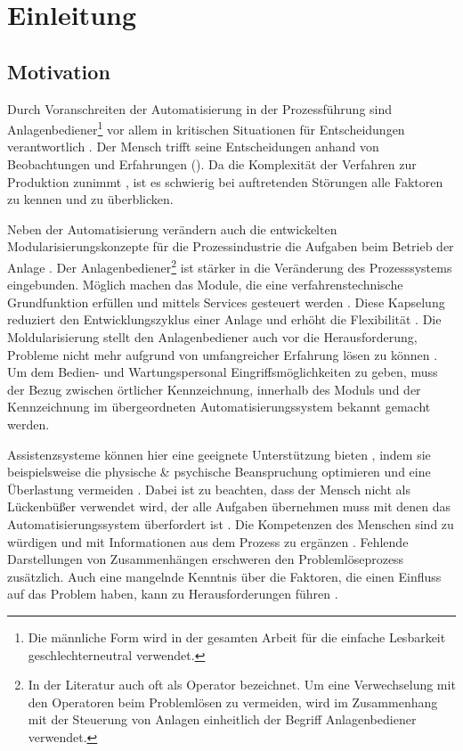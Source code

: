 
\chapter{Einleitung}
\label{sec:Einleitung}
\section{Motivation}
Durch Voranschreiten der Automatisierung in der Prozessführung sind Anlagenbediener\footnote{Die männliche Form wird in der gesamten Arbeit für die einfache Lesbarkeit geschlechterneutral verwendet.} vor allem in kritischen Situationen für Entscheidungen verantwortlich \cite{Bainbridge1983}. Der Mensch trifft seine Entscheidungen anhand von Beobachtungen und Erfahrungen (). Da die Komplexität der Verfahren zur Produktion zunimmt \cite{Poetter2007}, ist es schwierig bei auftretenden Störungen alle Faktoren zu kennen und zu überblicken. 

Neben der Automatisierung verändern auch die entwickelten Modularisierungskonzepte für die Prozessindustrie die Aufgaben beim Betrieb der Anlage \cite{Muller2017}. Der Anlagenbediener\footnote{In der Literatur auch oft als Operator bezeichnet. Um eine Verwechselung mit den Operatoren beim Problemlösen zu vermeiden, wird im Zusammenhang mit der Steuerung von Anlagen einheitlich der Begriff Anlagenbediener verwendet.} ist stärker in die Veränderung des Prozesssystems eingebunden. Möglich machen das Module, die eine verfahrenstechnische Grundfunktion erfüllen und mittels Services gesteuert werden \cite{Bloch2017}. Diese Kapselung reduziert den Entwicklungszyklus einer Anlage und erhöht die Flexibilität \cite{ZVEI2015}. Die Moldularisierung stellt den Anlagenbediener auch vor die Herausforderung, Probleme nicht mehr aufgrund von umfangreicher Erfahrung lösen zu können \cite{Muller2018}. \glqq Um dem Bedien- und Wartungspersonal Eingriffsmöglichkeiten zu geben, muss der Bezug zwischen örtlicher Kennzeichnung, innerhalb des Moduls und der Kennzeichnung im übergeordneten Automatisierungssystem bekannt gemacht werden.\grqq \ \citep[28]{Obst2013}

Assistenzsysteme können hier eine geeignete Unterstützung bieten \cite{Dalgleish2007}, indem sie beispielsweise die physische \& psychische Beanspruchung optimieren und eine Überlastung vermeiden \cite{Weisner2018}. Dabei ist zu beachten, dass der Mensch nicht als Lückenbüßer verwendet wird, der alle Aufgaben übernehmen muss mit denen das Automatisierungssystem überfordert ist \cite{Dalgleish2007}. Die Kompetenzen des Menschen sind zu würdigen und mit Informationen aus dem Prozess zu ergänzen \cite{Weisner2018}. Fehlende Darstellungen von Zusammenhängen erschweren den Problemlöseprozess zusätzlich. Auch eine mangelnde Kenntnis über die Faktoren, die einen Einfluss auf das Problem haben, kann zu Herausforderungen führen \cite{Herczeg2003}.

